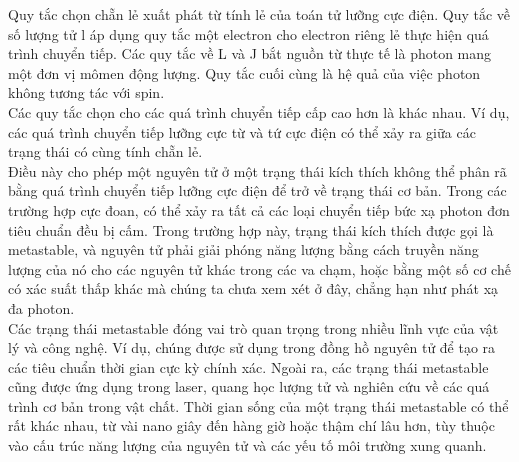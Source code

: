 \documentclass{article}
\begin{document}
Quy tắc chọn chẵn lẻ xuất phát từ tính lẻ của toán tử lưỡng cực điện. Quy tắc về số lượng tử l áp dụng quy tắc một electron cho electron riêng lẻ thực hiện quá trình chuyển tiếp. Các quy tắc về L và J bắt nguồn từ thực tế là photon mang một đơn vị mômen động lượng. Quy tắc cuối cùng là hệ quả của việc photon không tương tác với spin.\\

Các quy tắc chọn cho các quá trình chuyển tiếp cấp cao hơn là khác nhau. Ví dụ, các quá trình chuyển tiếp lưỡng cực từ và tứ cực điện có thể xảy ra giữa các trạng thái có cùng tính chẵn lẻ.\\
Điều này cho phép một nguyên tử ở một trạng thái kích thích không thể phân rã bằng quá trình chuyển tiếp lưỡng cực điện để trở về trạng thái cơ bản. Trong các trường hợp cực đoan, có thể xảy ra tất cả các loại chuyển tiếp bức xạ photon đơn tiêu chuẩn đều bị cấm. Trong trường hợp này, trạng thái kích thích được gọi là metastable, và nguyên tử phải giải phóng năng lượng bằng cách truyền năng lượng của nó cho các nguyên tử khác trong các va chạm, hoặc bằng một số cơ chế có xác suất thấp khác mà chúng ta chưa xem xét ở đây, chẳng hạn như phát xạ đa photon.\\

Các trạng thái metastable đóng vai trò quan trọng trong nhiều lĩnh vực của vật lý và công nghệ. Ví dụ, chúng được sử dụng trong đồng hồ nguyên tử để tạo ra các tiêu chuẩn thời gian cực kỳ chính xác. Ngoài ra, các trạng thái metastable cũng được ứng dụng trong laser, quang học lượng tử và nghiên cứu về các quá trình cơ bản trong vật chất. Thời gian sống của một trạng thái metastable có thể rất khác nhau, từ vài nano giây đến hàng giờ hoặc thậm chí lâu hơn, tùy thuộc vào cấu trúc năng lượng của nguyên tử và các yếu tố môi trường xung quanh.
\end{document}
